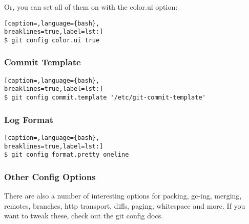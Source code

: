 Or, you can set all of them on with the color.ui option:
\lstset{basicstyle=\scriptsize, numbers=none, captionpos=b, tabsize=4}
\begin{lstlisting}[caption=,language={bash},
breaklines=true,label=lst:]
$ git config color.ui true
\end{lstlisting}

\subsubsection{Commit Template}
\lstset{basicstyle=\scriptsize, numbers=none, captionpos=b, tabsize=4}
\begin{lstlisting}[caption=,language={bash},
breaklines=true,label=lst:]
$ git config commit.template '/etc/git-commit-template'
\end{lstlisting}

\subsubsection{Log Format}
\lstset{basicstyle=\scriptsize, numbers=none, captionpos=b, tabsize=4}
\begin{lstlisting}[caption=,language={bash},
breaklines=true,label=lst:]
$ git config format.pretty oneline
\end{lstlisting}

\subsubsection{Other Config Options}
There are also a number of interesting options for packing, gc-ing, merging,
remotes, branches, http transport, diffs, paging, whitespace and more. If you
want to tweak these, check out the git config docs.
